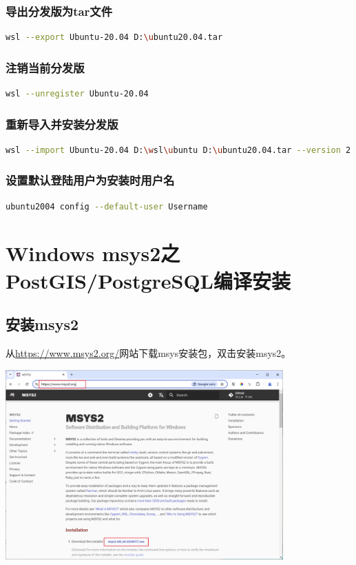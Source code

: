 \subsection{导出分发版为tar文件}
\begin{lstlisting}[language=bash]
wsl --export Ubuntu-20.04 D:\ubuntu20.04.tar
\end{lstlisting}


\subsection{注销当前分发版}
\begin{lstlisting}[language=bash]
wsl --unregister Ubuntu-20.04
\end{lstlisting}


\subsection{重新导入并安装分发版}
\begin{lstlisting}[language=bash]
wsl --import Ubuntu-20.04 D:\wsl\ubuntu D:\ubuntu20.04.tar --version 2
\end{lstlisting}


\subsection{设置默认登陆用户为安装时用户名}
\begin{lstlisting}[language=bash]
ubuntu2004 config --default-user Username
\end{lstlisting}


\chapter{Windows msys2之PostGIS/PostgreSQL编译安装}

\section{安装msys2}
从\href{https://www.msys2.org/}{https://www.msys2.org/}网站下载msys安装包，双击安装msys2。

\begin{center}
	\includegraphics[width=0.8\textwidth]{03install/msys2_download.png}
\end{center}



